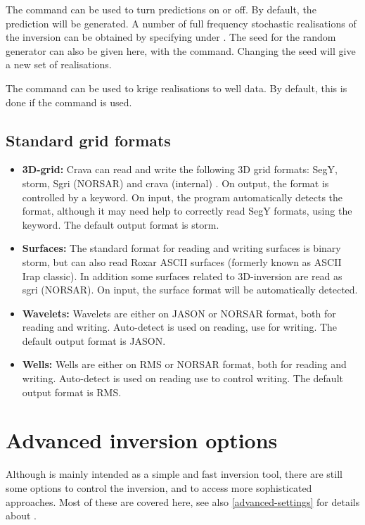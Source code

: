 The command  can be used to turn
predictions on or off. By default, the prediction will be generated. A
number of full frequency stochastic realisations of the inversion can
be obtained by specifying  under . The seed for the random generator can also be given here, with the  command. Changing the seed will give a new set of realisations.

The command  can be
used to krige realisations to well data. By default, this is done if
the  command is used. 

\subsection{Standard grid formats}
\label{sec:gridformats}
\begin{itemize}
\item {\bf 3D-grid:} Crava can read and write the following 3D grid
  formats: SegY, storm, Sgri (NORSAR) and crava (internal) . On
  output, the format is controlled by a  keyword. On input,
  the program automatically detects the format, although it may need
  help to correctly read SegY formats, using the 
  keyword. The default output format is storm.

\item {\bf Surfaces:} The standard format for reading and writing
  surfaces is binary storm, but \crava can also read Roxar ASCII
  surfaces (formerly known as ASCII Irap classic). In addition some
  surfaces related to 3D-inversion are read as sgri (NORSAR). On
  input, the surface format will be automatically detected.

\item {\bf Wavelets:} Wavelets are either on JASON or NORSAR format,
  both for reading and writing. Auto-detect is used on reading, use 
  for writing. The default output format is JASON.

\item{\bf Wells:} Wells are either on RMS or NORSAR format, both for
  reading and writing. Auto-detect is used on reading use  to
  control writing. The default output format is RMS.

\end{itemize}


\section{Advanced inversion options}
\label{sec:advinvusr}
Although \crava is mainly intended as a simple and fast inversion
tool, there are still some options to control the inversion, and to
access more sophisticated approaches. Most of these are covered here,
see 
also \autoref{advanced-settings} for details about
. 

